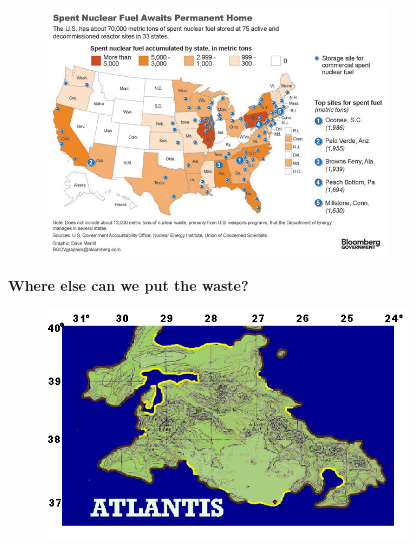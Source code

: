 \documentclass[aspectratio=1610,pdftex,dvipsnames,compress,xcolor={dvipsnames}]{beamer}
\begin{document}
\begin{frame}{}
    \begin{figure}
        \centering
        \includegraphics[width=0.80\textwidth]{snf.sites.jpg}
    \end{figure}
\end{frame}


\begin{frame}[plain]{}
    \centering\LARGE\textbf{Where else can we put the waste?}
\end{frame}


\addtocounter{framenumber}{-1} 
\begin{frame}{}
    \begin{figure}
        \centering
        \includegraphics[width=0.85\textwidth]{atlantis.jpg}
    \end{figure}
\end{frame}
\end{document}
